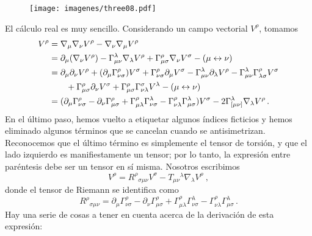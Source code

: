 \documentclass[11pt,b5paper,openany,twoside]{book}
\newcommand{\mn}{{\mu\nu}}
\newcommand{\p}[1]{{\partial_{#1}}}
\begin{document}
\begin{figure}[h]
\centering
\texttt{[image: imagenes/three08.pdf]}
\end{figure}

El cálculo real es muy sencillo.
Considerando un campo vectorial $V^\rho$, tomamos
\begin{align}
[\nabla_\mu,\nabla_\nu]V^\rho &=  \nabla_\mu\nabla_\nu
V^\rho - \nabla_\nu\nabla_\mu V^\rho  \notag \\
&= \p\mu(\nabla_\nu V^\rho) -\Gamma^\lambda_{\mn} \nabla_\lambda
V^\rho + \Gamma^\rho_{\mu\sigma} \nabla_\nu V^\sigma
- (\mu \leftrightarrow \nu) \notag \\
&=  \p\mu \p\nu V^\rho + (\p\mu \Gamma^\rho_{\nu\sigma})V^\sigma
+\Gamma^\rho_{\nu\sigma}\p\mu V^\sigma - \Gamma^\lambda_{\mn}
\p\lambda V^\rho - \Gamma^\lambda_\mn \Gamma^\rho_{\lambda\sigma}
V^\sigma  \notag \\
&\qquad +\Gamma^\rho_{\mu\sigma}\p\nu V^\sigma + \Gamma^\rho_{\mu\sigma}
\Gamma^\sigma_{\nu\lambda}V^\lambda - (\mu\leftrightarrow \nu ) \notag \\
&=  (\p\mu\Gamma^\rho_{\nu\sigma}-\p\nu\Gamma^\rho_{\mu\sigma}
+\Gamma^\rho_{\mu\lambda}\Gamma^\lambda_{\nu\sigma}
-\Gamma^\rho_{\nu\lambda}\Gamma^\lambda_{\mu\sigma})V^\sigma
- 2\Gamma^\lambda_{[\mn]}\nabla_\lambda V^\rho \,. \label{3.65}
\end{align}
En el último paso, hemos vuelto a etiquetar algunos índices ficticios y hemos eliminado algunos términos que se cancelan cuando se antisimetrizan.
Reconocemos que el último término es simplemente el tensor de torsión, y que el lado izquierdo es manifiestamente un tensor; por lo tanto, la expresión entre paréntesis debe ser un tensor en sí misma.
Nosotros escribimos
\begin{equation}
[\nabla_\mu,\nabla_\nu]V^\rho = R^\rho{}_{\sigma\mn}V^\sigma
- T_{\mn}{}^\lambda\nabla_\lambda V^\rho\ ,\label{3.66}
\end{equation}
donde el tensor de Riemann se identifica como
\begin{equation}
R^\rho{}_{\sigma\mn}=\p\mu\Gamma^\rho_{\nu\sigma}- \p\nu
\Gamma^\rho_{\mu\sigma}+\Gamma^\rho_{\mu\lambda}
\Gamma^\lambda_{\nu\sigma} -\Gamma^\rho_{\nu\lambda}
\Gamma^\lambda_{\mu\sigma}\,.\label{3.67}
\end{equation}
Hay una serie de cosas a tener en cuenta acerca de la derivación de esta expresión:
\end{document}
